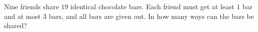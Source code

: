 Nine friends share $19$ identical chocolate bars. Each friend must get at least $1$ bar and at most $3$ bars, and all bars are given out. In how many ways can the bars be shared?
